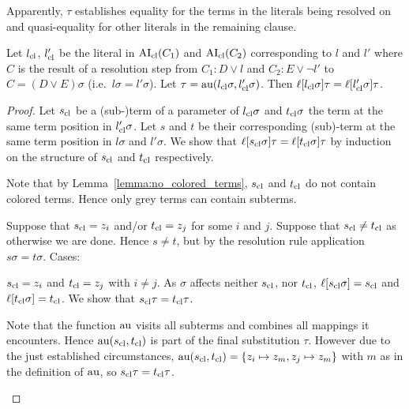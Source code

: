 \documentclass[,%
	paper=a4,%
	twoside=false,%
	liststotoc,
	bibtotoc,
	draft=false,%
	numbers=noendperiod
]{scrartcl}
\begin{document}
Apparently, $\tau$ establishes equality for the terms in the literals being resolved on and quasi-equality for other literals in the remaining clause.
\begin{lemma}
\label{lemma:literals_clauses_equal}
	Let $l_\mathrm{cl}$, $l_\mathrm{cl}'$ be the literal in $\operatorname{AI}_\mathrm{cl}(C_1)$ and $\operatorname{AI}_\mathrm{cl}(C_2)$ corresponding to $l$ and $l'$ where 
	$C$ is the result of a resolution step from $C_1: D\lor l$ and $C_2: E\lor \lnot l'$ to $C = (D \lor E)\sigma$
(i.e.~$l\sigma=l'\sigma$).
Let $\tau = \operatorname{au}(l_\mathrm{cl}\sigma, l_\mathrm{cl}'\sigma)$. Then $\ell[l_\mathrm{cl}\sigma]\tau = \ell[l_\mathrm{cl}'\sigma]\tau$.
\end{lemma}
\begin{proof} 
	Let $s_\mathrm{cl}$ be a (sub-)term of a parameter of $l_\mathrm{cl}\sigma$ and $t_\mathrm{cl}\sigma$ the term at the same term position in $l_\mathrm{cl}'\sigma$. Let $s$ and $t$ be their corresponding (sub)-term at the same term position in $l\sigma$ and $l'\sigma$.
We show that $\ell[s_\mathrm{cl}\sigma]\tau = \ell[t_\mathrm{cl}\sigma]\tau$ by induction on the structure of $s_\mathrm{cl}$ and $t_\mathrm{cl}$ respectively.

	Note that by Lemma~\ref{lemma:no_colored_terms}, $s_\mathrm{cl}$ and $t_\mathrm{cl}$ do not contain colored terms. Hence only grey terms can contain subterms.

	Suppose that $s_\mathrm{cl} = z_i$ and/or $t_\mathrm{cl} = z_j$ for some $i$ and $j$.
	Suppose that $s_\mathrm{cl} \neq t_\mathrm{cl}$ as otherwise we are done.
	Hence $s\neq t$, but by the resolution rule application $s\sigma = t\sigma$. Cases:
	\begin{compactitem}
		\item $s_\mathrm{cl} = z_i$ and $t_\mathrm{cl} = z_j$ with $i\neq j$.
					As $\sigma$ affects neither $s_\mathrm{cl}$, nor $t_\mathrm{cl}$,
					$\ell[s_\mathrm{cl} \sigma]  = s_\mathrm{cl}$ and
					$\ell[t_\mathrm{cl} \sigma]  = t_\mathrm{cl}$.
					We show that $s_\mathrm{cl}\tau = t_\mathrm{cl}\tau$.

					Note that the function $\operatorname{au}$ visits all subterms and combines all mappings it encounters.
					Hence $\operatorname{au}(s_\mathrm{cl}, t_\mathrm{cl})$ is part of the final substitution $\tau$.
					However due to the just established circumstances, $\operatorname{au}(s_\mathrm{cl}, t_\mathrm{cl}) = \{z_i \mapsto z_m, z_j \mapsto z_m\}$ with $m$ as in the definition of $\operatorname{au}$, so $s_\mathrm{cl}\tau = t_\mathrm{cl}\tau$.


\end{compactitem}
\end{proof}
\end{document}
